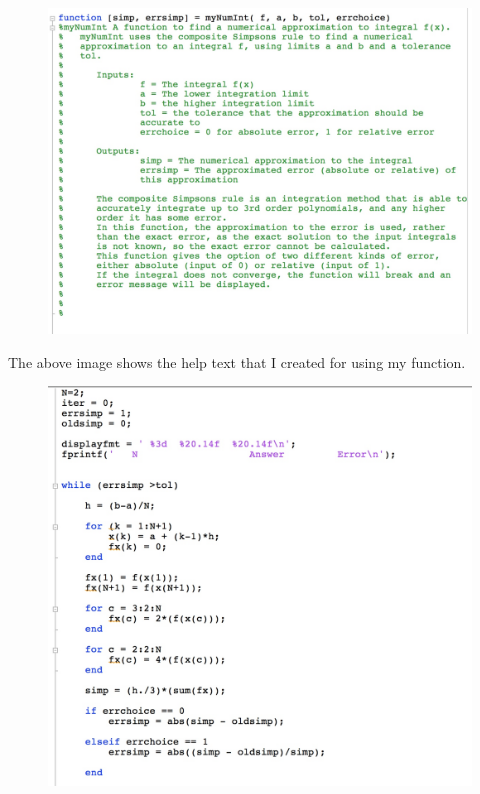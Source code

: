 \documentclass[a4paper]{article}
\begin{document}
\begin{figure}[H]
\includegraphics[width=1\textwidth]{mynumint1.jpg}
\end{figure}

The above image shows the help text that I created for using my function. 

\begin{figure}[H]
\includegraphics[width=1\textwidth]{mynumint2.jpg}
\end{figure}
\end{document}
